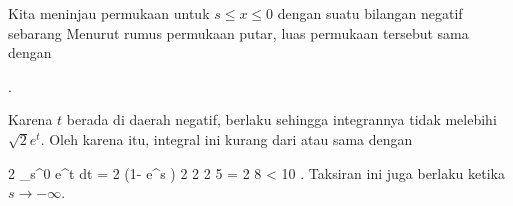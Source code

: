 Kita meninjau permukaan untuk $s \leq x \leq 0$ dengan suatu bilangan negatif sebarang
 Menurut rumus permukaan putar, luas permukaan tersebut sama dengan

 { . }

Karena $t$ berada di daerah negatif, berlaku
 sehingga integrannya tidak melebihi $\sqrt{2} e^t$. Oleh karena itu, integral ini kurang dari atau sama dengan

\mavergleichskettedisp
{\vergleichskette
{ 2 \pi {}  \int_s^0 e^t dt
}
{ =} { 2 \pi {} (1- e^s )
}
{ \leq} { 2 \pi {}
}
{ \leq} { 2 2 5
}
{ =} { 2 8
}
}
{
\vergleichskettefortsetzung
{ <} { 10
}
{ } {}
{ } {}
{ } {}
}{}{.}
Taksiran ini juga berlaku ketika $s \rightarrow - \infty$.
